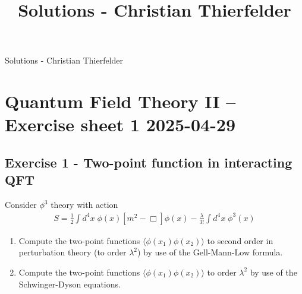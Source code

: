 \documentclass[10pt,a4paper]{article}
\title{Solutions - Christian Thierfelder}
\theoremstyle{definition}
\begin{document}
\centerline{{\Large Solutions - Christian Thierfelder}}




\section{Quantum Field Theory II – Exercise sheet 1 2025-04-29}
\subsection{Exercise 1 - Two-point function in interacting QFT}
{\color{blue} Consider $\phi^3$ theory with action
\begin{align}
S=\frac{1}{2}\int d^4x\;\phi(x)\left[m^2-\Box\right]\phi(x)-\frac{\lambda}{3!}\int d^4x\;\phi^3(x) \tag{1}
\end{align}

\begin{enumerate}[1.]
\item Compute the two-point functions $\langle\phi(x_1)\phi(x_2)\rangle$ to second order in perturbation theory (to order $\lambda^2$) by use of the Gell-Mann-Low formula.
\item Compute the two-point functions $\langle\phi(x_1)\phi(x_2)\rangle$ to order $\lambda^2$ by use of the Schwinger-Dyson equations.
\end{enumerate}
}
\end{document}
